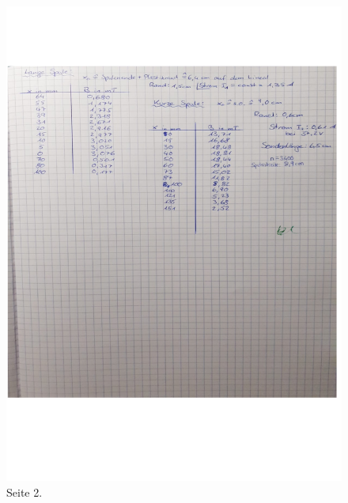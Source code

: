 \begin{figure}
    \centering
    \includegraphics[width=\textwidth]{content/data1.pdf}
    \caption{Seite 2.}
    \label{fig:data2}
\end{figure}